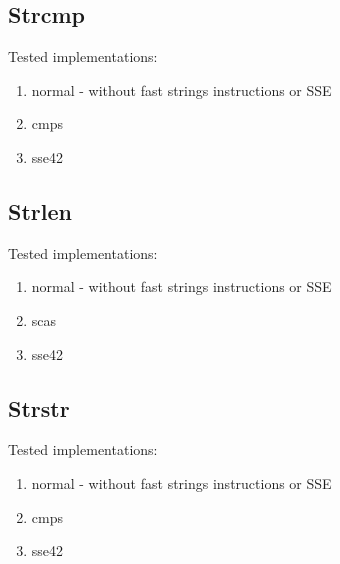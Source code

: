 \documentclass[11pt,a4paper]{article}
\begin{document}
\subsection{Strcmp}\label{subsec:strcmp}
    Tested implementations:
    \begin{enumerate}
        \item normal - without fast strings instructions or SSE
        \item cmps
        \item sse42
    \end{enumerate}

\subsection{Strlen}\label{subsec:strlen}
    Tested implementations:
    \begin{enumerate}
        \item normal - without fast strings instructions or SSE
        \item scas
        \item sse42
    \end{enumerate}

\subsection{Strstr}\label{subsec:strstr}
    Tested implementations:
    \begin{enumerate}
        \item normal - without fast strings instructions or SSE
        \item cmps
        \item sse42
    \end{enumerate}
\end{document}
